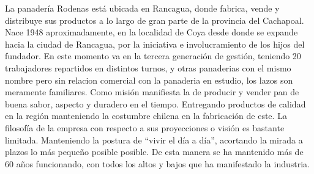 La panadería Rodenas está ubicada en Rancagua, donde fabrica, vende y distribuye
sus productos a lo largo de gran parte de la provincia del Cachapoal. Nace 1948
aproximadamente, en la localidad de Coya desde donde se expande hacia la ciudad de
Rancagua, por la iniciativa e involucramiento de los hijos del fundador. En este momento va
en la tercera generación de gestión, teniendo 20 trabajadores repartidos en distintos turnos,
y otras panaderias con el mismo nombre pero sin relacion comercial con la panaderia en
estudio, los lazos son meramente familiares.
Como misión manifiesta la de producir y vender pan de buena sabor, aspecto y
duradero en el tiempo. Entregando productos de calidad en la región manteniendo la
costumbre chilena en la fabricación de este.
La filosofía de la empresa con respecto a sus proyecciones o visión es bastante
limitada. Manteniendo la postura de “vivir el día a día”, acortando la mirada a plazos lo más
pequeño posible posible. De esta manera se ha mantenido más de 60 años funcionando, con
todos los altos y bajos que ha manifestado la industria.